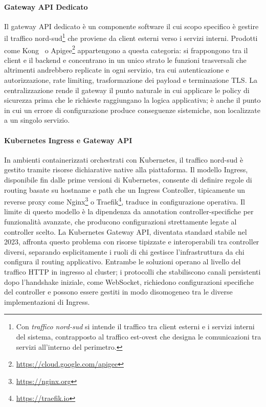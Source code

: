 \paragraph{Gateway API Dedicato}
Il gateway \gls{API} dedicato è un componente software il cui scopo specifico è gestire il traffico nord-sud\footnote{Con \emph{traffico nord-sud} si intende il traffico tra client esterni e i servizi interni del sistema, contrapposto al traffico est-ovest che designa le comunicazioni tra servizi all'interno del perimetro.} che proviene da client esterni verso i servizi interni. Prodotti come Kong~\cite{kongGateway2026} o Apigee\footnote{\url{https://cloud.google.com/apigee}} appartengono a questa categoria: si frappongono tra il client e il backend e concentrano in un unico strato le funzioni trasversali che altrimenti andrebbero replicate in ogni servizio, tra cui autenticazione e autorizzazione, rate limiting, trasformazione dei payload e terminazione \gls{TLS}. La centralizzazione rende il gateway il punto naturale in cui applicare le policy di sicurezza prima che le richieste raggiungano la logica applicativa; è anche il punto in cui un errore di configurazione produce conseguenze sistemiche, non localizzate a un singolo servizio.

\paragraph{Kubernetes Ingress e Gateway API}
In ambienti containerizzati orchestrati con Kubernetes, il traffico nord-sud è gestito tramite risorse dichiarative native alla piattaforma. Il modello Ingress, disponibile fin dalle prime versioni di Kubernetes, consente di definire regole di routing basate su hostname e path che un Ingress Controller, tipicamente un reverse proxy come Nginx\footnote{\url{https://nginx.org}} o Traefik\footnote{\url{https://traefik.io}}, traduce in configurazione operativa. Il limite di questo modello è la dipendenza da annotation controller-specifiche per funzionalità avanzate, che producono configurazioni strettamente legate al controller scelto. La Kubernetes Gateway API, diventata standard stabile nel 2023, affronta questo problema con risorse tipizzate e interoperabili tra controller diversi, separando esplicitamente i ruoli di chi gestisce l'infrastruttura da chi configura il routing applicativo. Entrambe le soluzioni operano al livello del traffico \gls{HTTP} in ingresso al cluster; i protocolli che stabiliscono canali persistenti dopo l'handshake iniziale, come WebSocket, richiedono configurazioni specifiche del controller e possono essere gestiti in modo disomogeneo tra le diverse implementazioni di Ingress.

